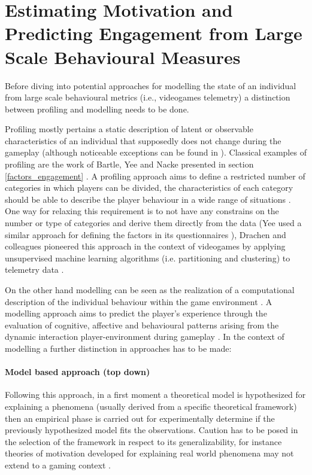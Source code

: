 \section{Estimating Motivation and Predicting Engagement from Large Scale Behavioural Measures}
\label{estpred_motivation_engagement}
Before diving into potential approaches for modelling the state of an individual from large scale behavioural metrics (i.e., videogames telemetry) a distinction between profiling and modelling needs to be done. 

Profiling mostly pertains a static description of latent or observable characteristics of an individual that supposedly does not change during the gameplay \cite{yannakakis2013player} (although noticeable exceptions can be found in \cite{sifa2013behavior, pirker2016playstyles, aung2018predicting}). Classical examples of profiling are the work of Bartle, Yee and Nacke presented in section \ref{factors_engagement} \cite{bartle1996hearts, yee2006motivations, nacke2011brainhex}. A profiling approach aims to define a restricted number of categories in which players can be divided, the characteristics of each category should be able to describe the player behaviour in a wide range of situations \cite{yannakakis2013player, van2009psychologically, van2011games}. One way for relaxing this requirement is to not have any constrains on the number or type of categories and derive them directly from the data (Yee used a similar approach for defining the factors in its questionnaires \cite{yee2006motivations}), Drachen and colleagues pioneered this approach in the context of videogames by applying unsupervised machine learning algorithms (i.e. partitioning and clustering) to telemetry data \cite{tychsen2008defining,drachen2009player, drachen2012guns}. 

On the other hand modelling can be seen as the realization of a computational description of the individual behaviour within the game environment \cite{yannakakis2013player}. A modelling approach aims to predict the player’s experience through the evaluation of cognitive, affective and behavioural patterns arising from the dynamic interaction player-environment during gameplay \cite{yannakakis2013player}. In the context of modelling a further distinction in approaches has to be made:

\paragraph*{Model based approach (top down)} Following this approach, in a first moment a theoretical model is hypothesized for explaining a phenomena (usually derived from a specific theoretical framework) then an empirical phase is carried out for experimentally determine if the previously hypothesized model fits the observations. Caution has to be posed in the selection of the framework in respect to its generalizability, for instance theories of motivation developed for explaining real world phenomena may not extend to a gaming context \cite{yannakakis2013player}.

